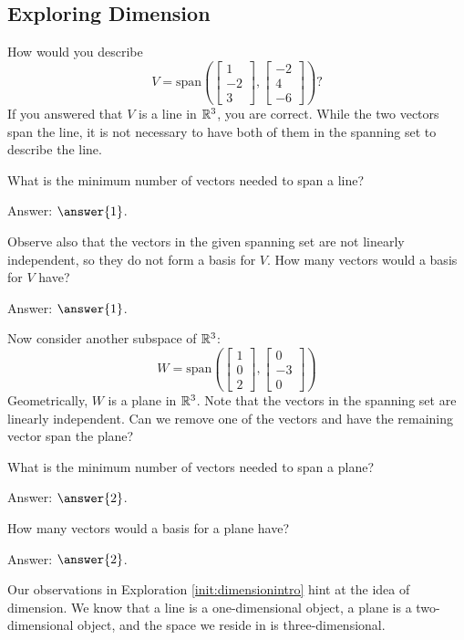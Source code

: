 \documentclass{ximera}
\begin{document}
\subsection*{Exploring Dimension}
\begin{exploration}\label{init:dimensionintro}
How would you describe 
$$V=\mbox{span}\left(\begin{bmatrix}1\\-2\\3\end{bmatrix}, \begin{bmatrix}-2\\4\\-6\end{bmatrix}\right)?$$
If you answered that $V$ is a line in $\mathbb{R}^3$, you are correct.  While the two vectors span the line, it is not necessary to have both of them in the spanning set to describe the line. 

What is the minimum number of vectors needed to span a line?  

Answer: $\answer{1}$.

Observe also that the vectors in the given spanning set are not linearly independent, so they do not form a basis for $V$.  How many vectors would a basis for $V$ have?

Answer: $\answer{1}$.

Now consider another subspace of $\mathbb{R}^3$:
$$W=\mbox{span}\left(\begin{bmatrix}1\\0\\2\end{bmatrix}, \begin{bmatrix}0\\-3\\0\end{bmatrix}\right)$$
Geometrically, $W$ is a plane in $\mathbb{R}^3$.  Note that the vectors in the spanning set are linearly independent.  Can we remove one of the vectors and have the remaining vector span the plane?  

What is the minimum number of vectors needed to span a plane?

Answer: $\answer{2}$.

How many vectors would a basis for a plane have?

Answer: $\answer{2}$.
\end{exploration}

Our observations in Exploration \ref{init:dimensionintro} hint at the idea of dimension.  We know that a line is a one-dimensional object, a plane is a two-dimensional object, and the space we reside in is three-dimensional.  
\end{document}
